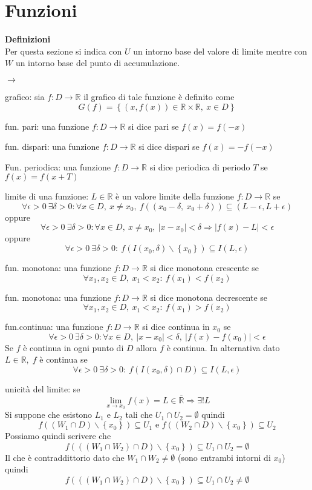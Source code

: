 \documentclass[12pt,a4paper]{article}
\newcommand*{\ep}{\epsilon}
\newcommand{\fr}{$f: D \to \mathbb{R} $}
\begin{document}
\section*{Funzioni}
\textbf{Definizioni\\}
Per questa sezione si indica con $U$ un intorno base del valore di limite mentre con $W$ un intorno base del punto di accumulazione. 
\begin{list}{$\rightarrow$}{}
    \item grafico: sia \fr{} il grafico di tale funzione è definito come \[G(f) = \left\{ (x, f(x)) \in \mathbb{R} \times \mathbb{R}, \: x \in D\right\} \]
    \item fun. pari: una funzione \fr{} si dice pari se $f(x) = f(-x)$
    \item fun. dispari: una funzione \fr{} si dice dispari se $f(x) = -f(-x)$
    \item Fun. periodica: una funzione \fr{} si dice periodica di periodo $T$ se $f(x) = f(x + T)$
    \item limite di una funzione: $L \in \mathbb{R}$ è un valore limite della funzione \fr{} se \[\forall \ep > 0 \: \exists \delta > 0 : \forall x \in D, \: x \neq x_0, \: f((x_0 - \delta, \: x_0 + \delta)) \subseteq (L - \ep, L + \ep)\] oppure \[\forall \ep > 0 \: \exists \delta > 0 : \forall x \in D, \: x \neq x_0, \: \left\lvert x - x_0\right\rvert < \delta \Rightarrow \left\lvert f(x) - L\right\rvert < \ep  \] oppure \[\forall \ep > 0 \: \exists \delta > 0 : \: f(I(x_0, \delta) \smallsetminus \left\{x_0\right\} ) \subseteq I(L, \ep)\]
    \item fun. monotona: una funzione \fr{} si dice monotona crescente se \[\forall x_1, x_2 \in D, \: x_1 < x_2 : \: f(x_1) < f(x_2)\]
    \item fun. monotona: una funzione \fr{} si dice monotona decrescente se \[\forall x_1, x_2 \in D, \: x_1 < x_2 : \: f(x_1) > f(x_2)\]
    \item fun.continua: una funzione \fr{} si dice continua in $x_0$ se \[\forall \ep > 0 \: \exists \delta > 0 : \forall x \in D, \: \left\lvert x - x_0\right\rvert < \delta, \: \left\lvert f(x) - f(x_0)\right\rvert < \ep \] Se $f$ è continua in ogni punto di $D$ allora $f$ è continua. In alternativa dato $ L \in \mathbb{R}, \; f$ è continua se \[\forall \ep > 0 \: \exists \delta > 0 : \: f(I(x_0, \delta) \cap D) \subseteq I(L, \ep)\] 
    \item unicità del limite: se \[\lim_{x \to x_0} f(x) = L \in \overline{\mathbb{R}} \Rightarrow \exists! L\] Si suppone che esistono $L_1$ e $L_2$ tali che $U_1 \cap U_2 = \emptyset$ quindi \[f((W_1 \cap D) \smallsetminus \left\{x_0\right\}) \subseteq U_1 \text{ e } f((W_2 \cap D) \smallsetminus \left\{x_0\right\}) \subseteq U_2\] Possiamo quindi scrivere che \[f(((W_1 \cap W_2)\cap D) \smallsetminus \left\{x_0\right\}) \subseteq U_1 \cap U_2 = \emptyset\] Il che è contraddittorio dato che $W_1 \cap W_2 \neq \emptyset$ (sono entrambi intorni di $x_0$) quindi \[f(((W_1 \cap W_2)\cap D) \smallsetminus \left\{x_0\right\}) \subseteq U_1 \cap U_2 \neq \emptyset\]

\end{list}
\end{document}
